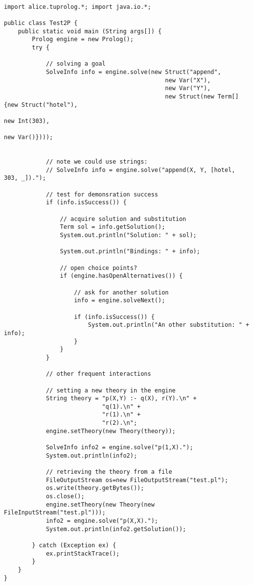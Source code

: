 {\tt\scriptsize{\begin{verbatim}

import alice.tuprolog.*; import java.io.*;

public class Test2P {
    public static void main (String args[]) {
        Prolog engine = new Prolog();
        try {

            // solving a goal
            SolveInfo info = engine.solve(new Struct("append",
                                              new Var("X"),
                                              new Var("Y"),
                                              new Struct(new Term[]{new Struct("hotel"),
                                                                    new Int(303),
                                                                    new Var()})));


            // note we could use strings:
            // SolveInfo info = engine.solve("append(X, Y, [hotel, 303, _]).");

            // test for demonsration success
            if (info.isSuccess()) {

                // acquire solution and substitution
                Term sol = info.getSolution();
                System.out.println("Solution: " + sol);

                System.out.println("Bindings: " + info);

                // open choice points?
                if (engine.hasOpenAlternatives()) {

                    // ask for another solution
                    info = engine.solveNext();

                    if (info.isSuccess()) {
                        System.out.println("An other substitution: " + info);
                    }
                }
            }

            // other frequent interactions

            // setting a new theory in the engine
            String theory = "p(X,Y) :- q(X), r(Y).\n" +
                            "q(1).\n" +
                            "r(1).\n" +
                            "r(2).\n";
            engine.setTheory(new Theory(theory));

            SolveInfo info2 = engine.solve("p(1,X).");
            System.out.println(info2);

            // retrieving the theory from a file
            FileOutputStream os=new FileOutputStream("test.pl");
            os.write(theory.getBytes());
            os.close();
            engine.setTheory(new Theory(new FileInputStream("test.pl")));
            info2 = engine.solve("p(X,X).");
            System.out.println(info2.getSolution());

        } catch (Exception ex) {
            ex.printStackTrace();
        }
    }
}
\end{verbatim}}}

